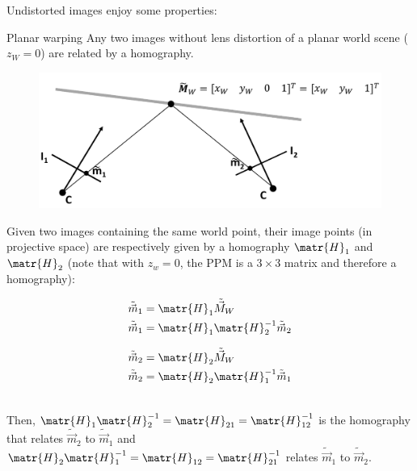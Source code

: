 Undistorted images enjoy some properties:
\begin{descriptionlist}
    \item[Planar warping] 
        Any two images without lens distortion of a planar world scene ($z_W=0$) are related by a homography.
        \begin{figure}[H]
            \centering
            \includegraphics[width=0.5\linewidth]{./img/_warp_application1.pdf}
        \end{figure}
        Given two images containing the same world point, their image points (in projective space) are respectively given by a homography $\matr{H}_1$ and $\matr{H}_2$ 
        (note that with $z_w=0$, the PPM is a $3 \times 3$ matrix and therefore a homography):\\[-0.5em]
        \begin{minipage}{0.5\linewidth}            
            \[
                \begin{split}
                    \tilde{\vec{m}}_1 &= \matr{H}_1 \tilde{\vec{M}}_W \\
                    \tilde{\vec{m}}_1 &= \matr{H}_1 \matr{H}_2^{-1} \tilde{\vec{m}}_2 \\
                \end{split}
            \]
        \end{minipage}
        \begin{minipage}{0.5\linewidth}            
            \[
                \begin{split}
                    \tilde{\vec{m}}_2 &= \matr{H}_2 \tilde{\vec{M}}_W \\
                    \tilde{\vec{m}}_2 &= \matr{H}_2 \matr{H}_1^{-1} \tilde{\vec{m}}_1 \\
                \end{split}
            \]
        \end{minipage}\\[0.5em]
        Then, $\matr{H}_1 \matr{H}_2^{-1} = \matr{H}_{21} = \matr{H}_{12}^{-1}$ is the homography that relates $\tilde{\vec{m}}_2$ to $\tilde{\vec{m}}_1$
        and $\matr{H}_2 \matr{H}_1^{-1} = \matr{H}_{12} = \matr{H}_{21}^{-1}$ relates $\tilde{\vec{m}}_1$ to $\tilde{\vec{m}}_2$.


\end{descriptionlist}

